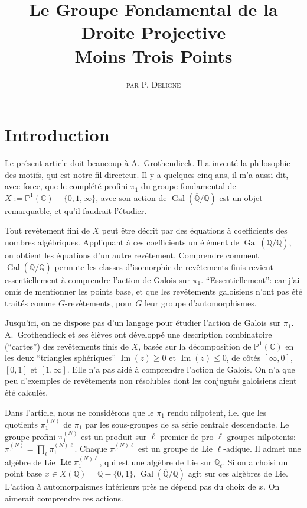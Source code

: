 \documentclass[12pt,a4paper]{article}
\title{\textbf{Le Groupe Fondamental de la Droite Projective\\Moins Trois Points}}
\author{\textsc{par P. Deligne}}
\date{}
\theoremstyle{plain}
\theoremstyle{definition}
\theoremstyle{remark}
\DeclareMathOperator{\Gal}{Gal}
\DeclareMathOperator{\Lie}{Lie}
\providecommand{\Gal}{\operatorname{Gal}}
\providecommand{\Lie}{\operatorname{Lie}}
\begin{document}
\maketitle
\thispagestyle{empty}

\section*{Introduction}

Le pr\'esent article doit beaucoup \`a A.~Grothendieck. Il a invent\'e la
philosophie des motifs, qui est notre fil directeur. Il y a quelques cinq
ans, il m'a aussi dit, avec force, que le compl\'et\'e profini $\pi_1$ du groupe
fondamental de $X := \mathbb{P}^1(\mathbb{C}) - \{0, 1, \infty\}$, avec son action de
$\Gal(\overline{\mathbb{Q}}/\mathbb{Q})$ est un objet remarquable, et qu'il faudrait l'\'etudier.

Tout rev\^etement fini de $X$ peut \^etre d\'ecrit par des \'equations \`a coefficients
des nombres alg\'ebriques. Appliquant \`a ces coefficients un \'el\'ement de
$\Gal(\overline{\mathbb{Q}}/\mathbb{Q})$, on obtient les \'equations d'un autre rev\^etement. Comprendre
comment $\Gal(\overline{\mathbb{Q}}/\mathbb{Q})$ permute les classes d'isomorphie de rev\^etements finis
revient essentiellement \`a comprendre l'action de Galois sur $\pi_1$. ``Essentiellement'':
car j'ai omis de mentionner les points base, et que les rev\^etements galoisiens n'ont pas
\'et\'e trait\'es comme $G$-rev\^etements, pour $G$ leur groupe d'automorphismes.

Jusqu'ici, on ne dispose pas d'un langage pour \'etudier l'action de Galois sur
$\pi_1$. A.~Grothendieck et ses \`el\`eves ont d\'evelopp\'e une description combinatoire
(``cartes'') des rev\^etements finis de $X$, bas\'ee sur la d\'ecomposition de
$\mathbb{P}^1(\mathbb{C})$ en les deux ``triangles sph\'eriques'' $\operatorname{Im}(z) \geq 0$ et
$\operatorname{Im}(z) \leq 0$, de c\^ot\'es $[\infty, 0]$, $[0,1]$ et $[1,\infty]$.
Elle n'a pas aid\'e \`a comprendre l'action de Galois. On n'a que peu d'exemples de
rev\^etements non r\'esolubles dont les conjugu\'es galoisiens aient \'et\'e calcul\'es.

Dans l'article, nous ne consid\'erons que le $\pi_1$ rendu nilpotent, i.e. que les
quotients $\pi_1^{(N)}$ de $\pi_1$ par les sous-groupes de sa s\'erie centrale descendante.
Le groupe profini $\pi_1^{(N)}$ est un produit sur $\ell$ premier de pro-$\ell$-groupes
nilpotents: $\pi_1^{(N)} = \prod_\ell \pi_1^{(N)\ell}$. Chaque $\pi_1^{(N)\ell}$ est un
groupe de Lie $\ell$-adique. Il admet une alg\`ebre de Lie $\Lie\pi_1^{(N)\ell}$, qui est
une alg\`ebre de Lie sur $\mathbb{Q}_\ell$. Si on a choisi un point base
$x \in X(\mathbb{Q}) = \mathbb{Q} - \{0, 1\}$, $\Gal(\overline{\mathbb{Q}}/\mathbb{Q})$ agit sur ces alg\`ebres de
Lie. L'action \`a automorphismes int\'erieurs pr\`es ne d\'epend pas du choix de $x$.
On aimerait comprendre ces actions.
\end{document}
